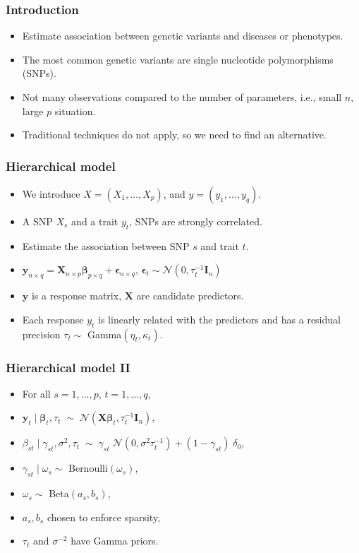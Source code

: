 \documentclass{beamer}
\begin{document}
\begin{frame}
\frametitle{Introduction}
\begin{itemize}
\item Estimate association between genetic variants and diseases or phenotypes.
\item The most common genetic variants are single nucleotide polymorphisms (SNPs).
\item Not many observations compared to the number of parameters, i.e., small $n$, large $p$ situation.
\item Traditional techniques do not apply, so we need to find an alternative.
\end{itemize}

\end{frame}
\begin{frame}
\frametitle{Hierarchical model}
\begin{itemize}
\item We introduce $X = (X_1,\ldots,X_p)$, and $y = (y_1,\ldots,y_q)$.
\item A SNP $X_s$ and a trait $y_t$, SNPs are strongly correlated.
\item Estimate the association between SNP $s$ and trait $t$.
\item $\boldsymbol{y}_{n\times q} = \boldsymbol{X}_{n\times p}\boldsymbol{\beta}_{p \times q} + \boldsymbol{\epsilon}_{n\times q}\text{, }\boldsymbol{\epsilon}_t \sim \mathcal{N}(0,\tau_t^{-1}\boldsymbol{I}_n)$
\item $\boldsymbol{y}$ is a response matrix, $\boldsymbol{X}$ are candidate predictors.

\item Each response $y_t$ is linearly related with the predictors and has a residual precision $\tau_t \sim $ Gamma$(\eta_t, \kappa_t)$.

\end{itemize}
\end{frame}
\begin{frame}
\frametitle{Hierarchical model II}
\begin{itemize}
\item For all $s = 1,\ldots,p$, $t=1,\ldots,q$,
\item $\boldsymbol{y}_t \mid \boldsymbol{\beta}_t, \tau_t\; \sim\; \mathcal{N}(\boldsymbol{X\beta}_t,\tau_t^{-1}\boldsymbol{I}_n)$,
\item $\beta_{st}\mid\gamma_{st},\sigma^2,\tau_t\; \sim\; \gamma_{st}\;\mathcal{N}(0,\sigma^2\tau_t^{-1})+(1-\gamma_{st})\;\delta_0$,
\item $\gamma_{st} \mid \omega_{s} \sim $ Bernoulli$(\omega_s)$,
\item $\omega_s \sim $ Beta$(a_s,b_s)$,
\item $a_s, b_s$ chosen to enforce sparsity,
\item $\tau_t$ and $\sigma^{-2}$ have Gamma priors.

\end{itemize}

\end{frame}
\end{document}
